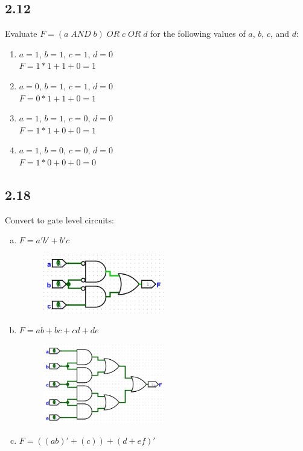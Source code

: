 \documentclass{article}
\begin{document}
\subsection*{2.12}
Evaluate $F = (a \; AND \; b) \; OR \; c \; OR \; d$ for the following values of $a$, $b$, $c$, and $d$:
\begin{enumerate}
    \item $a = 1$, $b = 1$, $c = 1$, $d = 0$ \\
    $ F = 1*1 + 1 + 0 = 1 $
    \item $a = 0$, $b = 1$, $c = 1$, $d = 0$ \\
    $ F = 0*1 + 1 + 0 = 1 $
    \item $a = 1$, $b = 1$, $c = 0$, $d = 0$ \\
    $ F = 1*1 + 0 + 0 = 1 $
    \item $a = 1$, $b = 0$, $c = 0$, $d = 0$ \\
    $ F = 1*0 + 0 + 0 = 0 $
\end{enumerate}

\subsection*{2.18}
Convert to gate level circuits:
\begin{enumerate}[(a)]
    \item $F = a'b' + b'c$
    \begin{figure}[h]
        \centering
        \includegraphics[width=0.5\textwidth]{./images/2_18_a.png}
    \end{figure}
    \item $F = ab + bc + cd + de$
    \begin{figure}[h]
        \centering
        \includegraphics[width=0.5\textwidth]{./images/2_18_b.png}
    \end{figure}
    \item $F = ((ab)' + (c)) + (d + ef)'$
\end{enumerate}
\end{document}
